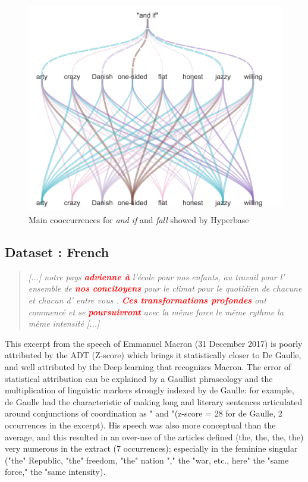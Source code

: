 \begin{figure}[h]
\begin{center}
\includegraphics[width=16cm]{img/cooc_english2.png}
\caption{Main cooccurrences for \textit{and if} and \textit{fall} showed by Hyperbase}
\label{data_english}
\end{center}
\end{figure}


\subsection{Dataset : French}

\begin{quote}
\textit{[...] notre pays \textcolor{red}{\textbf{advienne à}} l'école pour nos enfants, au travail pour l' ensemble de \textcolor{red}{\textbf{nos concitoyens}} pour le climat pour le quotidien de chacune et chacun d' entre vous . \textcolor{red}{\textbf{Ces transformations profondes}} ont commencé et se \textcolor{red}{\textbf{poursuivront}} avec la même force le même rythme la même intensité [...]} 
\end{quote}

This excerpt from the speech of Emmanuel Macron (31 December 2017) is poorly attributed by the ADT (Z-score) which brings it statistically closer to De Gaulle, and well attributed by the Deep learning that recognizes Macron.
The error of statistical attribution can be explained by a Gaullist phraseology and the multiplication of linguistic markers strongly indexed by de Gaulle: for example, de Gaulle had the characteristic of making long and literary sentences articulated around conjunctions of coordination as " and "(z-score = 28 for de Gaulle, 2 occurrences in the excerpt). His speech was also more conceptual than the average, and this resulted in an over-use of the articles defined (the, the, the, the) very numerous in the extract (7 occurrences); especially in the feminine singular ("the" Republic, "the" freedom, "the" nation "," the "war, etc., here" the "same force," the "same intensity).

